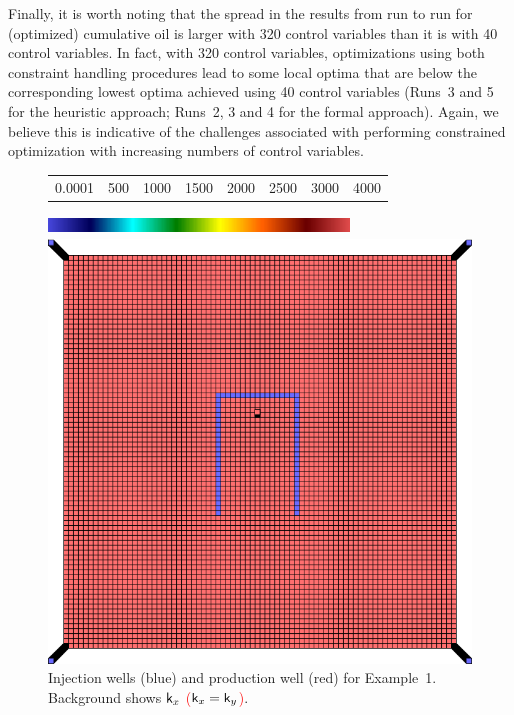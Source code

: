 \documentclass[twocolumn,numbook]{svjour3}          %
\newcommand{\red}[1]{\textcolor{red}{#1}}
\begin{document}
Finally, it is worth noting that the spread in the results from run to run for (optimized) cumulative oil is larger with 320 control variables than it is with 40 control variables. In fact, with 320 control variables, optimizations using both constraint handling procedures lead to some local optima that are below the corresponding lowest optima achieved using 40 control variables (Runs~3 and 5 for the heuristic approach; Runs~2, 3 and 4 for the formal approach). Again, we believe this is indicative of the challenges associated with performing constrained optimization with increasing numbers of control variables.






\begin{figure}[ht]
\begin{center}
     \begin{tabular}{cccccccc}
      0.0001 &  500 & 1000 & 1500 & 2000 & 2500 & 3000 &4000
      \end{tabular}
      \includegraphics[width=8cm, height=0.5cm]{VanEssenModelPermeabilityMapColorBar.png}
       
       \medskip

       \includegraphics[totalheight=3.in]{PiPermeabilityMapAndWells.png} 
       \end{center}
     \caption{Injection wells (blue) and production well (red) for Example~1. Background shows \red{$\mathsf{k}_x$ ($ \mathsf{k}_x = \mathsf{k}_y$)}.}
  \label{fig:PImodelPermeabilityMapAndWells}
\end{figure}
\end{document}
